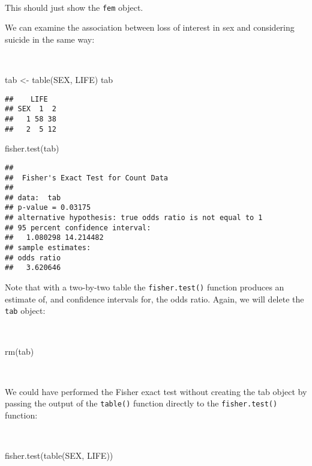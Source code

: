 \documentclass[
  12pt,
  a4paper]{book}
\newenvironment{Shaded}{\begin{snugshade}}{\end{snugshade}}
\newcommand{\FunctionTok}[1]{\textcolor[rgb]{0.00,0.00,0.00}{#1}}
\newcommand{\NormalTok}[1]{#1}
\newcommand{\OtherTok}[1]{\textcolor[rgb]{0.56,0.35,0.01}{#1}}
\begin{document}
~

This should just show the \texttt{fem} object.

We can examine the association between loss of interest in sex and considering suicide in the same way:

~

\begin{Shaded}
\begin{Highlighting}[]
\NormalTok{tab }\OtherTok{\textless{}{-}} \FunctionTok{table}\NormalTok{(SEX, LIFE)}
\NormalTok{tab}
\end{Highlighting}
\end{Shaded}

\begin{verbatim}
##    LIFE
## SEX  1  2
##   1 58 38
##   2  5 12
\end{verbatim}

\begin{Shaded}
\begin{Highlighting}[]
\FunctionTok{fisher.test}\NormalTok{(tab)}
\end{Highlighting}
\end{Shaded}

\begin{verbatim}
## 
##  Fisher's Exact Test for Count Data
## 
## data:  tab
## p-value = 0.03175
## alternative hypothesis: true odds ratio is not equal to 1
## 95 percent confidence interval:
##   1.080298 14.214482
## sample estimates:
## odds ratio 
##   3.620646
\end{verbatim}

\newpage

Note that with a two-by-two table the \texttt{fisher.test()} function produces an estimate of, and confidence intervals for, the odds ratio. Again, we will delete the \texttt{tab} object:

~

\begin{Shaded}
\begin{Highlighting}[]
\FunctionTok{rm}\NormalTok{(tab)}
\end{Highlighting}
\end{Shaded}

~

We could have performed the Fisher exact test without creating the tab object by passing the output of the \texttt{table()} function directly to the \texttt{fisher.test()} function:

~

\begin{Shaded}
\begin{Highlighting}[]
\FunctionTok{fisher.test}\NormalTok{(}\FunctionTok{table}\NormalTok{(SEX, LIFE))}
\end{Highlighting}
\end{Shaded}
\end{document}
